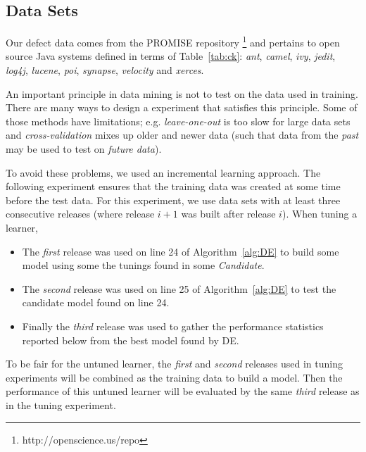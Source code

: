 \documentclass[final,twocolumn,5p]{elsarticle}
\newcommand{\bi}{\begin{itemize}[leftmargin=0.4cm]}
\newcommand{\ei}{\end{itemize}}
\newcommand{\tab}[1]{Table~\ref{tab:#1}}
\begin{document}
\subsection{Data Sets}\label{sect:dataa}

Our defect data comes from the PROMISE repository \footnote{http://openscience.us/repo}
and pertains to 
open source Java systems defined in terms of \tab{ck}:  {\it ant}, {\it camel}, {\it ivy}, {\it jedit}, {\it log4j}, {\it lucene},
{\it poi}, {\it synapse}, {\it velocity} and {\it xerces}. 

An important principle in data mining is not to test on the data used
in training.  There are many ways to design a experiment that satisfies this principle.
Some of those methods have  limitations; e.g.
{\em leave-one-out} is too slow for large data sets and
{\em cross-validation} mixes up older and newer data  (such that
data from the {\em past} may be used to test on {\em future data}).

To avoid these problems, we used an incremental learning approach. The following
experiment ensures that the training data was created at some time before the test
data.
For this experiment, we use data sets with at least three  
consecutive releases  (where release $i+1$ was built after release $i$). When tuning a learner,
\bi 



\item The {\em first} release was used  on line 24 of Algorithm~\ref{alg:DE} to
   build some model using some the tunings found in some {\em Candidate}.
 \item The {\em second} release was used on line 25 of Algorithm~\ref{alg:DE} to 
   test the candidate model found on line 24.
   \item Finally the {\em third} release was used to gather the performance statistics
   reported below from the best model found by DE.
 \ei
 
 To be fair for the untuned learner, the {\em first} and {\em second} releases used in tuning experiments
 will be combined as the training data to build a model. Then the performance of this untuned learner 
 will be evaluated by the same {\em third} release as in the tuning experiment.
 
\end{document}

